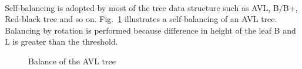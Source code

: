 \paragraph{}
Self-balancing is adopted by most of the tree data structure such as AVL, B/B+, Red-black tree and so on.
Fig.~\ref{qdt_fig:tree_balance_avl} illustrates a self-balancing of an AVL tree.
Balancing by rotation is performed because difference in height of the leaf B and L is greater than the threshold.
    \begin{figure}
        \centering
        \caption{Balance of the AVL tree \cite{Roura2013}}
        \label{qdt_fig:tree_balance_avl}
    \end{figure}

